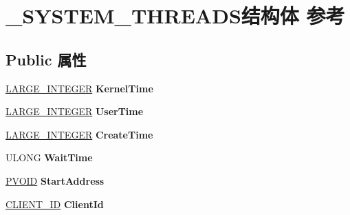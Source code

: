 \hypertarget{struct___s_y_s_t_e_m___t_h_r_e_a_d_s}{}\section{\+\_\+\+S\+Y\+S\+T\+E\+M\+\_\+\+T\+H\+R\+E\+A\+D\+S结构体 参考}
\label{struct___s_y_s_t_e_m___t_h_r_e_a_d_s}
\subsection*{Public 属性}
\begin{DoxyCompactItemize}
\item 
\mbox{\label{struct___s_y_s_t_e_m___t_h_r_e_a_d_s_a91ead4746a6a3c493dd53809adafb378}} 
\hyperlink{union___l_a_r_g_e___i_n_t_e_g_e_r}{L\+A\+R\+G\+E\+\_\+\+I\+N\+T\+E\+G\+ER} {\bfseries Kernel\+Time}
\item 
\mbox{\label{struct___s_y_s_t_e_m___t_h_r_e_a_d_s_a4d567b649e629104b9046a4ec51ee252}} 
\hyperlink{union___l_a_r_g_e___i_n_t_e_g_e_r}{L\+A\+R\+G\+E\+\_\+\+I\+N\+T\+E\+G\+ER} {\bfseries User\+Time}
\item 
\mbox{\label{struct___s_y_s_t_e_m___t_h_r_e_a_d_s_a3f17e500e5cfb98608967e9758921bad}} 
\hyperlink{union___l_a_r_g_e___i_n_t_e_g_e_r}{L\+A\+R\+G\+E\+\_\+\+I\+N\+T\+E\+G\+ER} {\bfseries Create\+Time}
\item 
\mbox{\label{struct___s_y_s_t_e_m___t_h_r_e_a_d_s_a228989217c89f564623e1b5a9becf0fb}} 
U\+L\+O\+NG {\bfseries Wait\+Time}
\item 
\mbox{\label{struct___s_y_s_t_e_m___t_h_r_e_a_d_s_af04b29a659538aa14d27a8994ca1abcd}} 
\hyperlink{interfacevoid}{P\+V\+O\+ID} {\bfseries Start\+Address}
\item 
\mbox{\label{struct___s_y_s_t_e_m___t_h_r_e_a_d_s_a83ffabdc00b58aa7dd5a2520638a6221}} 
\hyperlink{struct___c_l_i_e_n_t___i_d}{C\+L\+I\+E\+N\+T\+\_\+\+ID} {\bfseries Client\+Id}
\item 
\mbox{\label{struct___s_y_s_t_e_m___t_h_r_e_a_d_s_a8265dc4fabdb74750b34bda95f527ff7}} 

\end{DoxyCompactItemize}
